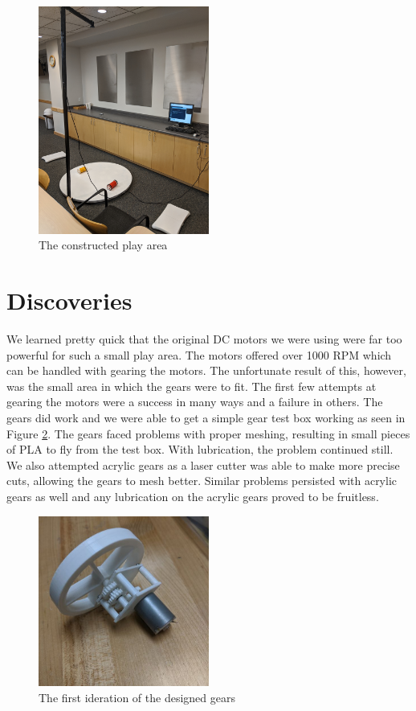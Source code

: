 \documentclass[11pt]{ieeeconf}
\begin{document}
\begin{figure}[H]
\centering
\captionsetup{justification=centering}
\includegraphics[width=0.5\textwidth]{images/PlayArea.jpg}
\caption{The constructed play area}
\label{area}
\end{figure}

\section{Discoveries}

We learned pretty quick that the original DC motors we were using were far too powerful for such a small play area. The motors offered over 1000 RPM which can be handled with gearing the motors. The unfortunate result of this, however, was the small area in which the gears were to fit. The first few attempts at gearing the motors were a success in many ways and a failure in others. The gears did work and we were able to get a simple gear test box working as seen in Figure \ref{gears}. The gears faced problems with proper meshing, resulting in small pieces of PLA to fly from the test box. With lubrication, the problem continued still. We also attempted acrylic gears as a laser cutter was able to make more precise cuts, allowing the gears to mesh better. Similar problems persisted with acrylic gears as well and any lubrication on the acrylic gears proved to be fruitless. 

\begin{figure}[H]
\centering
\captionsetup{justification=centering}
\includegraphics[width=0.5\textwidth]{images/GearTest.jpg}
\caption{The first ideration of the designed gears}
\label{gears}
\end{figure}
\end{document}
